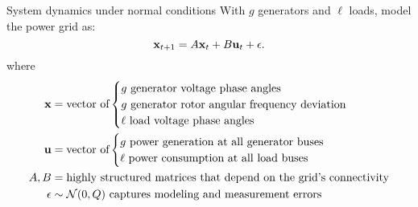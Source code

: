 \begin{frame}{System dynamics under normal conditions}
With $g$ generators and $\ell$ loads, model the power grid as:
\begin{equation}
\label{eq:discrete}
\mathbf{x}_{t+1} = A\mathbf{x}_t + B\mathbf{u}_t + \epsilon.
\end{equation}
where
\begin{align*}
\mathbf{x} &= 
\text{vector of}
\begin{cases}
\text{$g$ generator voltage phase angles} \\
\text{$g$ generator rotor angular frequency deviation} \\
\text{$\ell$ load voltage phase angles} \\
\end{cases} \\
\mathbf{u} &= \text{vector of} 
\begin{cases}
\text{$g$ power generation at all generator buses} \\
\text{$\ell$ power consumption at all load buses} \\
\end{cases}\\
A,B &= \text{highly structured matrices that depend on the grid's connectivity} \\
\epsilon &\sim \mathcal{N}(0,Q) \text{~captures modeling and measurement errors} \\
\end{align*}
\end{frame}


